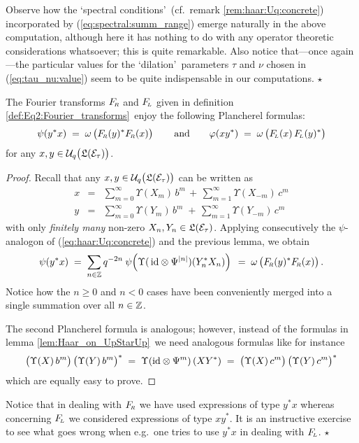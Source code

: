 \begin{remark_sec} \rm
Observe how the \lq spectral conditions\rq\ (cf.\ remark \ref{rem:haar:Uq:concrete})
incorporated by (\ref{eq:spectral:summ_range})
emerge naturally in the above computation, although here it has nothing
to do with any operator theoretic  considerations whatsoever; this is quite remarkable.
Also notice that---once again---the particular values for the
\lq dilation\rq\ parameters $\tau$ and $\nu$ chosen in (\ref{eq:tau_nu:value}) seem
to be quite indispensable in our computations.
\hfill $\star$
\end{remark_sec}



\begin{thm_sec} \label{thm:Eq2:Plancherel}
The Fourier transforms\/ $F_{\!\scriptscriptstyle R}$ and\/ $F_{\!\scriptscriptstyle L}$ given in definition
\ref{def:Eq2:Fourier_transforms}\ enjoy the following Plancherel formulas:
$$  \psi(y^* x)     \;=\;  \omega\left(\vertM \FRabb(y)^* \FRabb(x) \right)
                \andspace{2em}
    \varphi(x y^*)  \;=\;  \omega\left(\vertM \FLabb(x) \, \FLabb(y)^* \right) $$
for any\/ $x,y\in \Uq\!\left(\vertM \calL(\Hcore_\tau)\right)$.
\end{thm_sec}

\begin{proof}
Recall that any $x,y\in \Uq\!\left(\vertM \calL(\Hcore_\tau)\right)$ can be written as
\begin{eqnarray*}
  x  &=&  \sum_{m=0}^\infty \Upsilon(X_m)\, b^m \,+\,
          \sum_{m=1}^\infty \Upsilon(X_{-m})\, c^m
\\
  y  &=&  \sum_{m=0}^\infty \Upsilon(Y_m)\, b^m \;+\,
          \sum_{m=1}^\infty \Upsilon(Y_{-m})\, c^m
\end{eqnarray*}
with only {\em finitely many\/} non-zero $X_n, Y_n \in \mathfrak{L}(\mathcal E_\tau)$.
Applying consecutively the $\psi$-analogon of (\ref{eq:haar:Uq:concrete})
and the previous lemma, we obtain
$$ \psi(y^* x) \;=\; \sum_{n\in\ZZ}  q^{-2n} \: \psi \!
          \left(\Upsilon(\,\id \tens \Psi^{|n|})(Y_n^* X_n) \vertL\right)   \\
\;=\; \omega\left(\vertM \FRabb(y)^* \FRabb(x) \right).  $$ Notice how the
$n\geq 0$ and $n<0$ cases have been conveniently merged into a single summation
over all $n\in\mathbb{Z}$.

The second Plancherel formula is analogous; however, instead of the formulas in
lemma \ref{lem:Haar_on_UpStarUp}\ we need analogous formulas like for instance
$$\left(\Upsilon(X)\, b^m  \vertM\right)
          \left(\Upsilon(Y)\, b^m  \vertM\right)^*
    \;=\; \Upsilon \!\left(\id \tens \Psi^m \right)(X Y^*)
    \;=\; \left(\Upsilon(X)\, c^m  \vertM\right)
          \left(\Upsilon(Y)\, c^m  \vertM\right)^*  $$
which are equally easy to prove.
\end{proof}




\begin{remark_sec}  \rm
Notice that in dealing with $F_{\!\scriptscriptstyle R}$ we have used expressions of type $y^*x$
whereas concerning $F_{\!\scriptscriptstyle L}$ we considered expressions of type $x y^*$. It is an
instructive exercise to see what goes wrong when e.g.\ one tries to use $y^*x$
in dealing with $F_{\!\scriptscriptstyle L}$.
\hfill $\star$
\end{remark_sec}

